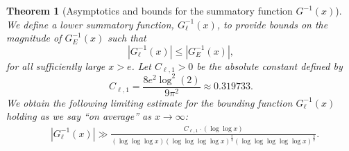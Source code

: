 \documentclass[11pt,reqno,a4letter]{article}
\numberwithin{figure}{section}
\numberwithin{table}{section}
\theoremstyle{plain}
\newtheorem{theorem}{Theorem}
\numberwithin{theorem}{section}
\theoremstyle{definition}
\newcommand{\NBRef}[1]{}
\newcommand{\SuccSim}[0]{\overset{_{\scriptsize{\blacktriangle}}}{\succsim}}
\renewcommand{\SuccSim}[0]{\ensuremath{\gg}}
\begin{document}
\begin{theorem}[Asymptotics and bounds for the summatory function $G^{-1}(x)$] 
\label{theorem_gInv_GeneralAsymptoticsForms}
We define a lower summatory function, $G_{\ell}^{-1}(x)$, 
to provide bounds on the magnitude of $G_E^{-1}(x)$ such that 
$$|G_{\ell}^{-1}(x)| \leq |G_E^{-1}(x)|,$$ 
for all sufficiently large $x > e$. 
Let $C_{\ell,1} > 0$ be the absolute constant defined by 
\[
C_{\ell,1} = \frac{8 e^2 \log^2(2)}{9 \pi^2} \approx 0.319733.  
\]
We obtain the following limiting estimate for the bounding function 
$G_{\ell}^{-1}(x)$ holding as we say ``on average'' as $x \rightarrow \infty$:   
\begin{align*} 
 & \left\lvert G_{\ell}^{-1}\left(x\right) \right\rvert
     \SuccSim 
     \frac{C_{\ell,1} \cdot (\log\log x)}{ 
     (\log\log\log x) (\log\log\log\log x)^{\frac{5}{4}} 
     (\log\log\log\log\log x)^{\frac{3}{2}}}. 
\end{align*} 
\end{theorem} 
\NBRef{A10-2020.04-26} 
\end{document}
